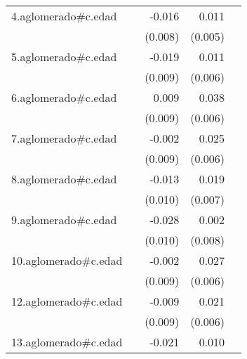 {\begin{longtable}{l*{4}{D{.}{.}{-1}}}
\addlinespace
4.aglomerado#c.edad&                     &      -0.016         &       0.011\sym{*}  &                     \\
            &                     &     (0.008)         &     (0.005)         &                     \\
\addlinespace
5.aglomerado#c.edad&                     &      -0.019\sym{*}  &       0.011         &                     \\
            &                     &     (0.009)         &     (0.006)         &                     \\
\addlinespace
6.aglomerado#c.edad&                     &       0.009         &       0.038\sym{***}&                     \\
            &                     &     (0.009)         &     (0.006)         &                     \\
\addlinespace
7.aglomerado#c.edad&                     &      -0.002         &       0.025\sym{***}&                     \\
            &                     &     (0.009)         &     (0.006)         &                     \\
\addlinespace
8.aglomerado#c.edad&                     &      -0.013         &       0.019\sym{**} &                     \\
            &                     &     (0.010)         &     (0.007)         &                     \\
\addlinespace
9.aglomerado#c.edad&                     &      -0.028\sym{**} &       0.002         &                     \\
            &                     &     (0.010)         &     (0.008)         &                     \\
\addlinespace
10.aglomerado#c.edad&                     &      -0.002         &       0.027\sym{***}&                     \\
            &                     &     (0.009)         &     (0.006)         &                     \\
\addlinespace
12.aglomerado#c.edad&                     &      -0.009         &       0.021\sym{***}&                     \\
            &                     &     (0.009)         &     (0.006)         &                     \\
\addlinespace
13.aglomerado#c.edad&                     &      -0.021\sym{**} &       0.010\sym{*}  &                     \\

\end{longtable}}
